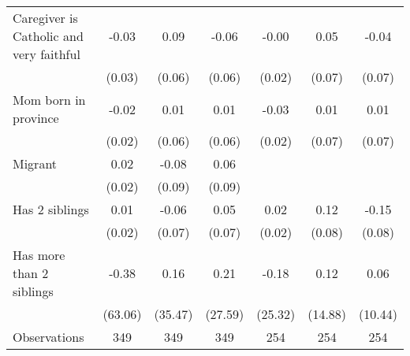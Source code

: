 {\begin{tabular}{l*{6}{c}}
\addlinespace
Caregiver is Catholic and very faithful&       -0.03         &        0.09         &       -0.06         &       -0.00         &        0.05         &       -0.04         \\
                    &      (0.03)         &      (0.06)         &      (0.06)         &      (0.02)         &      (0.07)         &      (0.07)         \\
\addlinespace
Mom born in province&       -0.02         &        0.01         &        0.01         &       -0.03         &        0.01         &        0.01         \\
                    &      (0.02)         &      (0.06)         &      (0.06)         &      (0.02)         &      (0.07)         &      (0.07)         \\
\addlinespace
Migrant         &        0.02         &       -0.08         &        0.06         &                     &                     &                     \\
                    &      (0.02)         &      (0.09)         &      (0.09)         &                     &                     &                     \\
\addlinespace
Has 2 siblings      &        0.01         &       -0.06         &        0.05         &        0.02         &        0.12         &       -0.15         \\
                    &      (0.02)         &      (0.07)         &      (0.07)         &      (0.02)         &      (0.08)         &      (0.08)         \\
\addlinespace
Has more than 2 siblings&       -0.38         &        0.16         &        0.21         &       -0.18         &        0.12         &        0.06         \\
                    &     (63.06)         &     (35.47)         &     (27.59)         &     (25.32)         &     (14.88)         &     (10.44)         \\
\midrule
Observations        &         349         &         349         &         349         &         254         &         254         &         254         \\
\bottomrule
\end{tabular}
}
